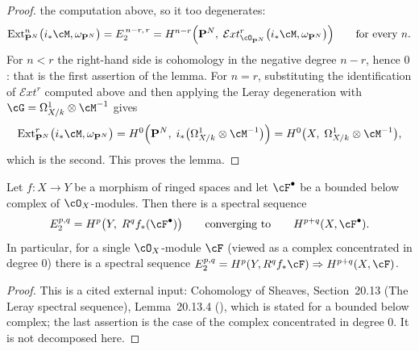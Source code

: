 \begin{proof}
the computation above, so it too degenerates:
\[
\operatorname{Ext}^{n}_{\mathbf P^N}\bigl(i_*\cM,\omega_{\mathbf P^N}\bigr)
=E_2^{\,n-r,\,r}
=H^{n-r}\Bigl(\mathbf P^N,\;
\mathcal{E}xt^{r}_{\cO_{\mathbf P^N}}\bigl(i_*\cM,\omega_{\mathbf P^N}\bigr)
\Bigr)
\qquad\text{for every }n.
\]
For $n<r$ the right-hand side is cohomology in the negative degree $n-r$, hence
$0$: that is the first assertion of the lemma.  For $n=r$, substituting the
identification of $\mathcal{E}xt^{r}$ computed above and then applying the
Leray degeneration with $\cG=\Omega^1_{X/k}\otimes\cM^{-1}$ gives
\[
\operatorname{Ext}^{r}_{\mathbf P^N}\bigl(i_*\cM,\omega_{\mathbf P^N}\bigr)
=H^0\Bigl(\mathbf P^N,\;i_*\bigl(\Omega^1_{X/k}\otimes\cM^{-1}\bigr)\Bigr)
=H^0\bigl(X,\;\Omega^1_{X/k}\otimes\cM^{-1}\bigr),
\]
which is the second.  This proves the lemma.
\end{proof}


\begin{lemma}
\label{lem:pc-leray-spectral-sequence}
Let $f:X\to Y$ be a morphism of ringed spaces and let $\cF^\bullet$ be a bounded below
complex of $\cO_X$-modules.  Then there is a spectral sequence
\[
E_2^{p,q}=H^p\bigl(Y,\;R^qf_*(\cF^\bullet)\bigr)
\qquad\text{converging to}\qquad H^{p+q}(X,\cF^\bullet).
\]
In particular, for a single $\cO_X$-module $\cF$ (viewed as a complex concentrated in
degree $0$) there is a spectral sequence
$E_2^{p,q}=H^p(Y,R^qf_*\cF)\Rightarrow H^{p+q}(X,\cF)$.
\end{lemma}
\begin{proof}
This is a cited external input: Cohomology of Sheaves, Section~20.13 (The Leray spectral
sequence), Lemma~20.13.4 (), which is stated for a bounded below
complex; the last assertion is the case of the complex concentrated in degree $0$.  It is
not decomposed here.
\end{proof}

